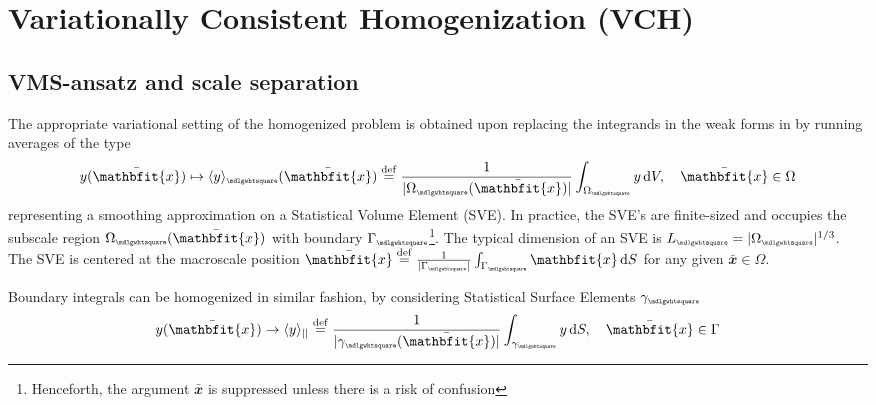\documentclass[12pt,a4paper]{article}
\renewcommand{\ta}[1]{\mathbfit{#1}}
\renewcommand{\Box}{\mdlgwhtsquare}
\DeclarePairedDelimiter{\homgen}{\langle}{\rangle_\rve}
\newcommand{\volume}{|\Omega_\rve|}
\newcommand{\rve}{
  {\mathchoice
   {\mbox{\scalebox{0.67}{$\Box$}}}
   {\mbox{\scalebox{0.67}{$\Box$}}}
   {\mbox{\scalebox{0.5}{$\Box$}}}
   {\mbox{\scalebox{0.375}{$\Box$}}}
  }
}
\begin{document}
\section{Variationally Consistent Homogenization (VCH)}

\subsection{VMS-ansatz and scale separation}

The appropriate variational setting of the homogenized problem is obtained upon replacing the integrands in the weak forms in  by running averages of the type
\begin{equation}
    y(\bar{\ta{x}}) \mapsto
    \homgen{y}(\bar{\ta{x}})\defeq \frac{1}{|{\Omega}_\rve(\bar{\ta{x}})|}\int_{{\Omega}_\rve} y \dif V, \quad
    \bar{\ta{x}}\in\Omega
    \label{eq16ba}
\end{equation}
representing a smoothing approximation on a Statistical Volume Element (SVE).
In practice, the SVE's are finite-sized and occupies the subscale region $\Omega_\rve(\bar{\ta{x}})$ with boundary $\Gamma_\rve$\footnote{Henceforth, the argument $\bar{\ta{x}}$ is suppressed unless there is a risk of confusion}.
The typical dimension of an SVE is $L_\rve=\volume^{1/3}$.
The SVE is centered at the macroscale position $\bar{\ta{x}}\defeq\frac{1}{|\Gamma_\rve|}\int_{\Gamma_\rve} \ta{x}\dif S$ for any given $\bar{\ta{x}}\in\Omega$.

Boundary integrals can be homogenized in similar fashion, by considering Statistical Surface Elements $\gamma_\rve$
\begin{align}
 y(\bar{\ta x}) \to \langle y \rangle_{||} \defeq \frac{1}{|\gamma_\rve(\bar{\ta x})|} \int_{\gamma_\rve} y \dif S, \quad \bar{\ta x} \in \Gamma
\end{align}
\end{document}
